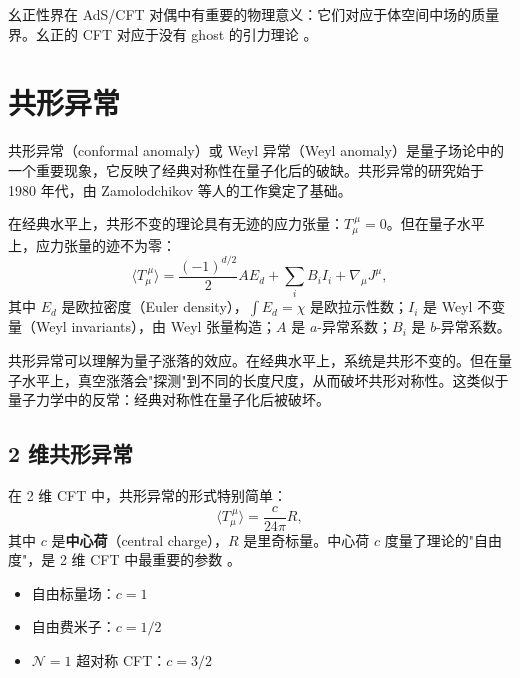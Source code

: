 \begin{remark}
幺正性界在 AdS/CFT 对偶中有重要的物理意义：它们对应于体空间中场的质量界。幺正的 CFT 对应于没有 ghost 的引力理论 \cite{Gubser1998}。
\end{remark}

\section{共形异常}

共形异常（conformal anomaly）或 Weyl 异常（Weyl anomaly）是量子场论中的一个重要现象，它反映了经典对称性在量子化后的破缺。共形异常的研究始于 1980 年代，由 Zamolodchikov \cite{Zamolodchikov1986} 等人的工作奠定了基础。

\begin{definition}[共形异常]
在经典水平上，共形不变的理论具有无迹的应力张量：$T_\mu^{~\mu} = 0$。但在量子水平上，应力张量的迹不为零：
\begin{equation}
    \langle T_\mu^{~\mu} \rangle = \frac{(-1)^{d/2}}{2} A E_d + \sum_i B_i I_i + \nabla_\mu J^\mu,
\end{equation}
其中 $E_d$ 是欧拉密度（Euler density），$\int E_d = \chi$ 是欧拉示性数；$I_i$ 是 Weyl 不变量（Weyl invariants），由 Weyl 张量构造；$A$ 是 $a$-异常系数；$B_i$ 是 $b$-异常系数。
\end{definition}

\begin{note}[物理理解]
共形异常可以理解为量子涨落的效应。在经典水平上，系统是共形不变的。但在量子水平上，真空涨落会"探测"到不同的长度尺度，从而破坏共形对称性。这类似于量子力学中的反常：经典对称性在量子化后被破坏。
\end{note}

\subsection{2 维共形异常}

\begin{theorem}[2 维共形异常]
在 2 维 CFT 中，共形异常的形式特别简单：
\begin{equation}
    \langle T_\mu^{~\mu} \rangle = \frac{c}{24\pi} R,
\end{equation}
其中 $c$ 是\textbf{中心荷}（central charge），$R$ 是里奇标量。中心荷 $c$ 度量了理论的"自由度"，是 2 维 CFT 中最重要的参数 \cite{Zamolodchikov1986}。
\end{theorem}

\begin{example}[自由场的中心荷]
\begin{itemize}
    \item 自由标量场：$c = 1$
    \item 自由费米子：$c = 1/2$
    \item $\mathcal{N}=1$ 超对称 CFT：$c = 3/2$
\end{itemize}
\end{example}

